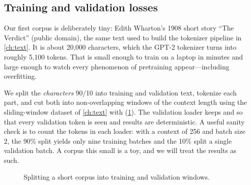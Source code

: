 \subsection{Training and validation losses}\label{sec:pretrain:trainval}

Our first corpus is deliberately tiny: Edith Wharton's 1908 short story ``The Verdict'' (public
domain), the same text used to build the tokenizer pipeline in \cref{ch:text}. It is about
20{,}000 characters, which the GPT-2 tokenizer turns into roughly 5{,}100 tokens. That is small
enough to train on a laptop in minutes and large enough to watch every phenomenon of
pretraining appear---including overfitting.

We split the \emph{characters} 90/10 into training and validation text, tokenize each part, and
cut both into non-overlapping windows of the context length using the sliding-window dataset of
\cref{ch:text} with  (\cref{fig:pretrain:split}). The validation
loader keeps  and  so that every validation token is
seen and results are deterministic. A useful sanity check is to count the tokens in each
loader: with a context of 256 and batch size 2, the 90\% split yields only nine training
batches and the 10\% split a single validation batch. A corpus this small is a toy, and we
will treat the results as such.

\begin{figure}[t]
\centering
{}
\caption{Splitting a short corpus into training and validation windows.}
\label{fig:pretrain:split}
\end{figure}

